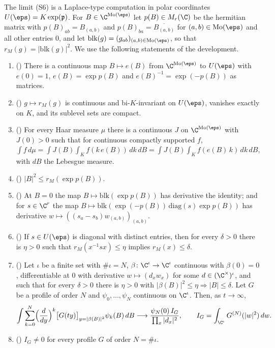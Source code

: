 The limit (S6) is a Laplace-type computation in polar coordinates $U(\eps)=K\exp(\mathfrak p)$. For
$B\in\C^{\mathrm{Mo}(\eps)}$ let $p(B)\in M_r(\C)$ be the hermitian matrix with $p(B)_{ab}=B_{(a,b)}$ and
$p(B)_{ba}=\overline{B_{(a,b)}}$ for $(a,b)\in\mathrm{Mo}(\eps)$ and all other entries $0$, and let $\mathrm{blk}(g)=
(g_{ab})_{(a,b)\in\mathrm{Mo}(\eps)}$, so that $r_M(g)=|\mathrm{blk}(g)|^2$. We use the following statements of the
development.
\begin{enumerate}[label=(B\arabic*)]
\item () There is a continuous map $B\mapsto e(B)$ from $\C^{\mathrm{Mo}(\eps)}$ to
$U(\eps)$ with $e(0)=1$, $e(B)=\exp p(B)$ and $e(B)^{-1}=\exp(-p(B))$ as matrices.
\item () $g\mapsto r_M(g)$ is continuous and bi-$K$-invariant on $U(\eps)$, vanishes
exactly on $K$, and its sublevel sets are compact.
\item () For every Haar measure $\mu$ there is a continuous $J$ on
$\C^{\mathrm{Mo}(\eps)}$ with $J(0)>0$ such that for continuous compactly supported $f$, $\int f\,d\mu=\int J(B)\int_K
f(k\,e(B))\,dk\,dB=\int J(B)\int_Kf(e(B)\,k)\,dk\,dB$, with $dB$ the Lebesgue measure.
\item () $|B|^2\le r_M(\exp p(B))$.
\item () At $B=0$ the map $B\mapsto\mathrm{blk}(\exp p(B))$ has derivative the
identity; and for $s\in\C^r$ the map $B\mapsto\mathrm{blk}(\exp(-p(B))\,\mathrm{diag}(s)\exp p(B))$ has derivative
$w\mapsto((s_a-s_b)w_{(a,b)})_{(a,b)}$.
\item () If $s\in U(\eps)$ is diagonal with distinct entries, then for every
$\delta>0$ there is $\eta>0$ such that $r_M(x^{-1}sx)\le\eta$ implies $r_M(x)\le\delta$.
\item () Let $\iota$ be a finite set with $\#\iota=N$,
$\beta\colon\C^\iota\to\C^\iota$ continuous with $\beta(0)=0$, differentiable at $0$ with derivative $w\mapsto(d_xw_x)$ for
some $d\in(\C^\times)^\iota$, and such that for every $\delta>0$ there is $\eta>0$ with $|\beta(B)|^2\le\eta\Rightarrow|B|\le
\delta$. Let $G$ be a profile of order $N$ and $\psi_0,\dots,\psi_N$ continuous on $\C^\iota$. Then, as $t\to\infty$,
\[
\int\sum_{k=0}^N\Bigl(\frac{d}{dy}\Bigr)^k\bigl[G(ty)\bigr]_{y=|\beta(B)|^2}\psi_k(B)\,dB\longrightarrow
\frac{\psi_N(0)\,I_G}{\prod_x|d_x|^2},\qquad I_G=\int_{\C^\iota}G^{(N)}(|w|^2)\,dw.
\]
\item () $I_G\ne0$ for every profile $G$ of order $N=\#\iota$.
\end{enumerate}

